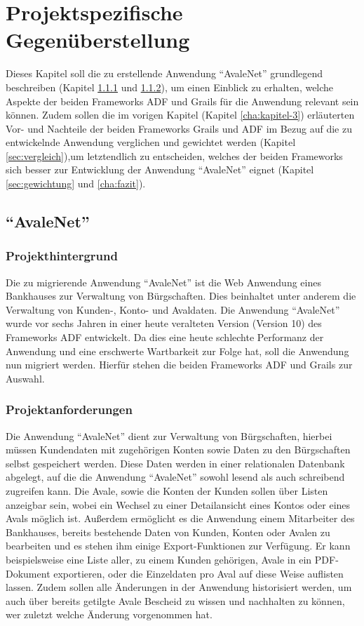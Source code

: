 \section{Projektspezifische Gegenüberstellung}
\label{cha:kapitel-4}
Dieses Kapitel soll die zu erstellende Anwendung "`AvaleNet"' grundlegend beschreiben (Kapitel \ref{sec:hintergrund} und \ref{sec:anforderung}), um einen Einblick zu erhalten, welche Aspekte der beiden Frameworks ADF und Grails für die Anwendung relevant sein können. Zudem sollen die im vorigen Kapitel (Kapitel \ref{cha:kapitel-3}) erläuterten Vor- und Nachteile der beiden Frameworks Grails und ADF im Bezug auf die zu entwickelnde Anwendung verglichen und gewichtet werden (Kapitel \ref{sec:vergleich}),um letztendlich zu entscheiden, welches der beiden Frameworks sich besser zur Entwicklung der Anwendung "`AvaleNet"' eignet (Kapitel \ref{sec:gewichtung} und \ref{cha:fazit}).
\subsection{"`AvaleNet"'}
\subsubsection{Projekthintergrund}
\label{sec:hintergrund}
Die zu migrierende Anwendung "`AvaleNet"' ist die Web Anwendung eines Bankhauses zur Verwaltung von Bürgschaften. Dies beinhaltet unter anderem die Verwaltung von Kunden-, Konto- und Avaldaten. Die Anwendung "`AvaleNet"' wurde vor sechs Jahren in einer heute veralteten Version (Version 10) des Frameworks ADF entwickelt. Da dies eine heute schlechte Performanz der Anwendung und eine erschwerte Wartbarkeit zur Folge hat, soll die Anwendung nun migriert werden. Hierfür stehen die beiden Frameworks ADF und Grails zur Auswahl.
\subsubsection{Projektanforderungen}
\label{sec:anforderung}
Die Anwendung "`AvaleNet"' dient zur Verwaltung von Bürgschaften, hierbei müssen Kundendaten mit zugehörigen Konten sowie Daten zu den Bürgschaften selbst gespeichert werden. Diese Daten werden in einer relationalen Datenbank abgelegt, auf die die Anwendung "`AvaleNet"' sowohl lesend als auch schreibend zugreifen kann. Die Avale, sowie die Konten der Kunden sollen über Listen anzeigbar sein, wobei ein Wechsel zu einer Detailansicht eines Kontos oder eines Avals möglich ist. Außerdem ermöglicht es die Anwendung einem Mitarbeiter des Bankhauses, bereits bestehende Daten von Kunden, Konten oder Avalen zu bearbeiten und es stehen ihm einige Export-Funktionen zur Verfügung. Er kann beispielsweise eine Liste aller, zu einem Kunden gehörigen, Avale in ein PDF-Dokument exportieren, oder die Einzeldaten pro Aval auf diese Weise auflisten lassen. Zudem sollen alle Änderungen in der Anwendung historisiert werden, um auch über bereits getilgte Avale Bescheid zu wissen und nachhalten zu können, wer zuletzt welche Änderung vorgenommen hat.

